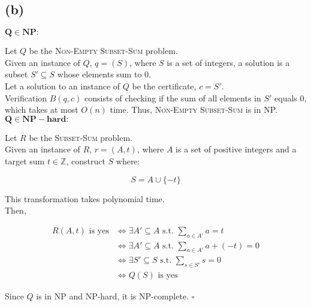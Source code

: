 \newpage
\subsection*{(b)}

\(\mathbf{Q \in NP:}\)

Let \( Q \) be the \textsc{Non-Empty Subset-Sum} problem.\\
Given an instance of \( Q \), \( q = (S) \), 
where \( S \) is a set of integers, a solution is a subset \( S' \subseteq S \) whose elements sum to \( 0 \).\\
Let a solution to an instance of \( Q \) be the certificate, \( c = S' \).\\

Verification \( B(q,c) \) consists of checking if the sum of all elements in \( S' \) equals \( 0 \), which takes at most \( O(n) \) time. Thus, \textsc{Non-Empty Subset-Sum} is in NP.\\

\(\mathbf{Q \in NP-hard:}\)

Let \( R \) be the \textsc{Subset-Sum} problem.\\
Given an instance of \( R \), \( r = (A, t) \), 
where \( A \) is a set of positive integers and a target sum \( t \in \mathbb{Z} \), construct \( S \) where:

\[
S = A \cup \{-t\}
\]

This transformation takes polynomial time.\\

Then,

\begin{equation}
    \begin{split}
        R(A, t) \text{ is yes} &\iff \exists A' \subseteq A \text{ s.t. } \sum_{a \in A'} a = t \\
        &\iff \exists A' \subseteq A \text{ s.t. } \sum_{a \in A'} a + (-t) = 0 \\
        &\iff \exists S' \subseteq S \text{ s.t. } \sum_{s \in S'} s = 0 \\
        &\iff Q(S) \text{ is yes}
    \end{split}
\end{equation}

Since \( Q \) is in NP and NP-hard, it is NP-complete. \(\square\)
